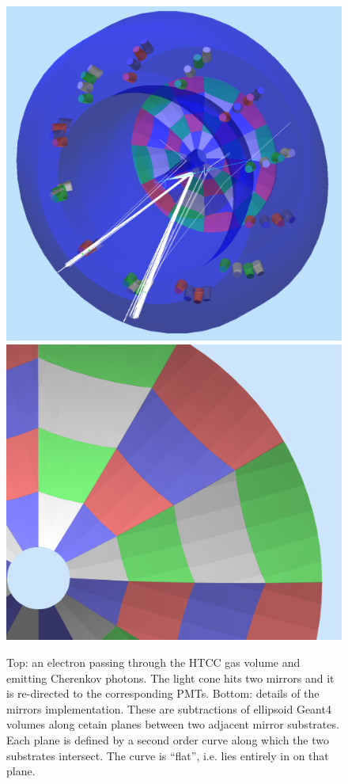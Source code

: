 \begin{figure}
	\centering
	\includegraphics[width=0.99\columnwidth,keepaspectratio]{img/htccGeometry.png}
	\includegraphics[width=0.99\columnwidth,keepaspectratio]{img/htccDetail.png}
	\caption{Top: an electron passing through the HTCC gas volume and emitting Cherenkov photons. The light cone
            hits two mirrors and it is re-directed to the corresponding PMTs.
            Bottom: details of the mirrors implementation. These are subtractions of ellipsoid Geant4 volumes along
            cetain planes between two adjacent mirror substrates. Each plane is defined by a second order
            curve along which the two substrates intersect. The curve is ``flat'', i.e. lies entirely in on that plane.}
	\label{fig:htccGeometry}
\end{figure}


